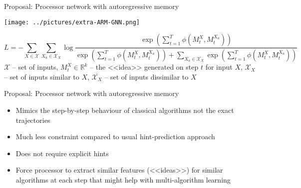 \documentclass[10pt]{beamer}
\newcommand\blfootnote[1]{%
	\begingroup
	\renewcommand\thefootnote{}\footnote{#1}%
	\addtocounter{footnote}{-1}%
	\endgroup
}
\begin{document}


\begin{frame}{Proposal: Processor network with autoregressive memory}
	\begin{center}
		\texttt{[image: ../pictures/extra-ARM-GNN.png]}
	\end{center}
	\begin{equation*}
		L = - \sum_{X\in \mathcal{X}}\sum\limits_{X_a \in \mathcal{X}_X}\log\frac{  \exp{\left(  \sum\limits_{t=1}^{T} \phi\left(M_t^X, M_t^{X_a}\right)  \right)}  }{  \exp{\left(  \sum_{t=1}^{T} \phi\left(M_t^X, M_t^{X_a}\right)  \right)} + \sum\limits_{\overline{X_a}\in \overline{\mathcal{X}_X}}\exp\left(\sum\limits_{t=1}^{T}\phi\left(M_t^X, M_t^{\overline{X_a}}\right)\right)  }
	\end{equation*}
		$\mathcal{X}$ -- set of inputs, $M_t^X\in \mathbb{R}^k$ -- the <<idea>> generated on step $t$ for input $X$, $\mathcal{X}_X$ -- set of inputs similar to $X$, $\overline{\mathcal{X}_X}$ -- set of inputs dissimilar to $X$
\end{frame}


\begin{frame}{Proposal: Processor network with autoregressive memory}
	\begin{itemize}
		\item Mimics the step-by-step behaviour of classical algorithms not the exact trajectories
		\item Much less constraint compared to usual hint-prediction approach
		\item Does not require explicit hints
		\item Force processor to extract similar features (<<ideas>>) for similar algorithms at each step that might help with multi-algorithm learning
	\end{itemize}
\end{frame}
\end{document}
